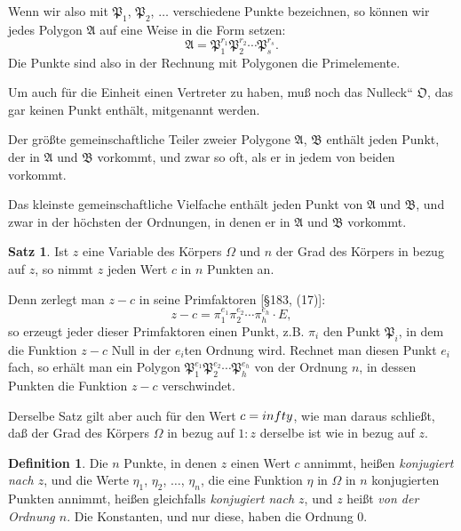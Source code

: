 \documentclass[12pt,a4paper]{article}
\theoremstyle{definition}
\newtheorem{defin}{Definition}[section]
\newtheorem{satz}{Satz}[section]
\begin{document}
Wenn wir also mit $\mathfrak{P}_1$, $\mathfrak{P}_2$, $\ldots$ verschiedene Punkte bezeichnen, so können wir jedes Polygon $\mathfrak{A}$ auf eine Weise in die Form setzen:
\begin{equation}
\mathfrak{A} = \mathfrak{P}_1^{r_1} \mathfrak{P}_2^{r_2} \cdots \mathfrak{P}_s^{r_s}.
\end{equation}
Die Punkte sind also in der Rechnung mit Polygonen die Primelemente.

Um auch für die Einheit einen Vertreter zu haben, muß noch das \glqq Nulleck`` $\mathfrak{O}$, das gar keinen Punkt enthält, mitgenannt werden.

Der größte gemeinschaftliche Teiler zweier Polygone $\mathfrak{A}$, $\mathfrak{B}$ enthält jeden Punkt, der in $\mathfrak{A}$ und $\mathfrak{B}$ vorkommt, und zwar so oft, als er in jedem von beiden vorkommt.

Das kleinste gemeinschaftliche Vielfache enthält jeden Punkt von $\mathfrak{A}$ und $\mathfrak{B}$, und zwar in der höchsten der Ordnungen, in denen er in $\mathfrak{A}$ und $\mathfrak{B}$ vorkommt.

\begin{satz}
Ist $z$ eine Variable des Körpers $\Omega$ und $n$ der Grad des Körpers in bezug auf $z$, so nimmt $z$ jeden Wert $c$ in $n$ Punkten an.
\end{satz}

Denn zerlegt man $z - c$ in seine Primfaktoren [\S 183, (17)]:
\[z - c = \pi_1^{e_1} \pi_2^{e_2} \cdots \pi_h^{e_h} \cdot E,\]
so erzeugt jeder dieser Primfaktoren einen Punkt, z.B. $\pi_i$ den Punkt $\mathfrak{P}_i$, in dem die Funktion $z - c$ Null in der $e_i$ten Ordnung wird. Rechnet man diesen Punkt $e_i$fach, so erhält man ein Polygon $\mathfrak{P}_1^{e_1} \mathfrak{P}_2^{e_2} \cdots \mathfrak{P}_h^{e_h}$ von der Ordnung $n$, in dessen Punkten die Funktion $z - c$ verschwindet.

Derselbe Satz gilt aber auch für den Wert $c = \\infty$, wie man daraus schließt, daß der Grad des Körpers $\Omega$ in bezug auf $1:z$ derselbe ist wie in bezug auf $z$.

\begin{defin}
Die $n$ Punkte, in denen $z$ einen Wert $c$ annimmt, heißen \emph{konjugiert nach $z$}, und die Werte $\eta_1$, $\eta_2$, $\ldots$, $\eta_n$, die eine Funktion $\eta$ in $\Omega$ in $n$ konjugierten Punkten annimmt, heißen gleichfalls \emph{konjugiert nach $z$}, und $z$ heißt \emph{von der Ordnung $n$}. Die Konstanten, und nur diese, haben die Ordnung $0$.
\end{defin}
\end{document}
